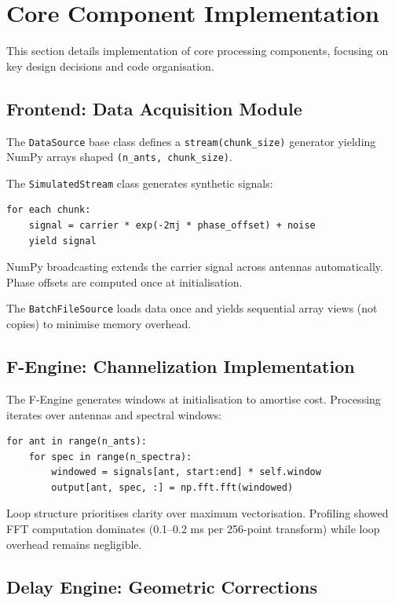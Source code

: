 \section{Core Component Implementation}

This section details implementation of core processing components, focusing on key design decisions and code organisation.

\subsection{Frontend: Data Acquisition Module}

The \texttt{DataSource} base class defines a \texttt{stream(chunk\_size)} generator yielding NumPy arrays shaped \texttt{(n\_ants, chunk\_size)}.

The \texttt{SimulatedStream} class generates synthetic signals:

\begin{verbatim}
for each chunk:
    signal = carrier * exp(-2πj * phase_offset) + noise
    yield signal
\end{verbatim}

NumPy broadcasting extends the carrier signal across antennas automatically. Phase offsets are computed once at initialisation.

The \texttt{BatchFileSource} loads data once and yields sequential array views (not copies) to minimise memory overhead.

\subsection{F-Engine: Channelization Implementation}

The F-Engine generates windows at initialisation to amortise cost. Processing iterates over antennas and spectral windows:

\begin{verbatim}
for ant in range(n_ants):
    for spec in range(n_spectra):
        windowed = signals[ant, start:end] * self.window
        output[ant, spec, :] = np.fft.fft(windowed)
\end{verbatim}

Loop structure prioritises clarity over maximum vectorisation. Profiling showed FFT computation dominates (0.1–0.2 ms per 256-point transform) while loop overhead remains negligible.

\subsection{Delay Engine: Geometric Corrections}

